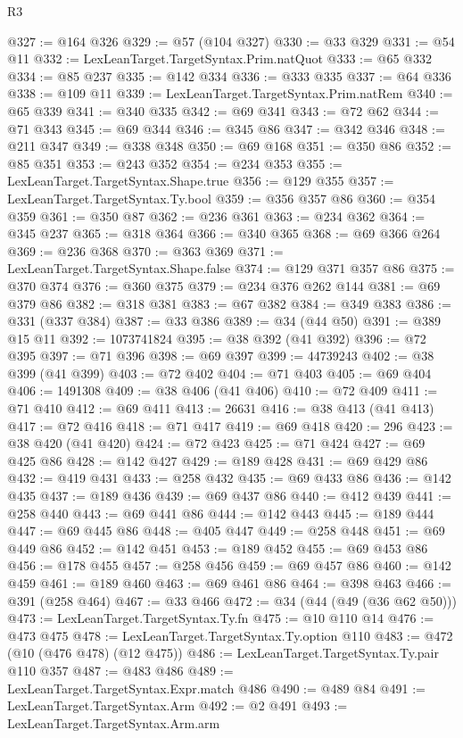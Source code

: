 \begin{lexlean}{R3}
\begin{coremodule}
@327 := @164 @326
@329 := @57 (@104 @327)
@330 := @33 @329
@331 := @54 @11
@332 := LexLeanTarget.TargetSyntax.Prim.natQuot
@333 := @65 @332
@334 := @85 @237
@335 := @142 @334
@336 := @333 @335
@337 := @64 @336
@338 := @109 @11
@339 := LexLeanTarget.TargetSyntax.Prim.natRem
@340 := @65 @339
@341 := @340 @335
@342 := @69 @341
@343 := @72 @62
@344 := @71 @343
@345 := @69 @344
@346 := @345 @86
@347 := @342 @346
@348 := @211 @347
@349 := @338 @348
@350 := @69 @168
@351 := @350 @86
@352 := @85 @351
@353 := @243 @352
@354 := @234 @353
@355 := LexLeanTarget.TargetSyntax.Shape.true
@356 := @129 @355
@357 := LexLeanTarget.TargetSyntax.Ty.bool
@359 := @356 @357 @86
@360 := @354 @359
@361 := @350 @87
@362 := @236 @361
@363 := @234 @362
@364 := @345 @237
@365 := @318 @364
@366 := @340 @365
@368 := @69 @366 @264
@369 := @236 @368
@370 := @363 @369
@371 := LexLeanTarget.TargetSyntax.Shape.false
@374 := @129 @371 @357 @86
@375 := @370 @374
@376 := @360 @375
@379 := @234 @376 @262 @144
@381 := @69 @379 @86
@382 := @318 @381
@383 := @67 @382
@384 := @349 @383
@386 := @331 (@337 @384)
@387 := @33 @386
@389 := @34 (@44 @50)
@391 := @389 @15 @11
@392 := 1073741824
@395 := @38 @392 (@41 @392)
@396 := @72 @395
@397 := @71 @396
@398 := @69 @397
@399 := 44739243
@402 := @38 @399 (@41 @399)
@403 := @72 @402
@404 := @71 @403
@405 := @69 @404
@406 := 1491308
@409 := @38 @406 (@41 @406)
@410 := @72 @409
@411 := @71 @410
@412 := @69 @411
@413 := 26631
@416 := @38 @413 (@41 @413)
@417 := @72 @416
@418 := @71 @417
@419 := @69 @418
@420 := 296
@423 := @38 @420 (@41 @420)
@424 := @72 @423
@425 := @71 @424
@427 := @69 @425 @86
@428 := @142 @427
@429 := @189 @428
@431 := @69 @429 @86
@432 := @419 @431
@433 := @258 @432
@435 := @69 @433 @86
@436 := @142 @435
@437 := @189 @436
@439 := @69 @437 @86
@440 := @412 @439
@441 := @258 @440
@443 := @69 @441 @86
@444 := @142 @443
@445 := @189 @444
@447 := @69 @445 @86
@448 := @405 @447
@449 := @258 @448
@451 := @69 @449 @86
@452 := @142 @451
@453 := @189 @452
@455 := @69 @453 @86
@456 := @178 @455
@457 := @258 @456
@459 := @69 @457 @86
@460 := @142 @459
@461 := @189 @460
@463 := @69 @461 @86
@464 := @398 @463
@466 := @391 (@258 @464)
@467 := @33 @466
@472 := @34 (@44 (@49 (@36 @62 @50)))
@473 := LexLeanTarget.TargetSyntax.Ty.fn
@475 := @10 @110 @14
@476 := @473 @475
@478 := LexLeanTarget.TargetSyntax.Ty.option @110
@483 := @472 (@10 (@476 @478) (@12 @475))
@486 := LexLeanTarget.TargetSyntax.Ty.pair @110 @357
@487 := @483 @486
@489 := LexLeanTarget.TargetSyntax.Expr.match @486
@490 := @489 @84
@491 := LexLeanTarget.TargetSyntax.Arm
@492 := @2 @491
@493 := LexLeanTarget.TargetSyntax.Arm.arm

\end{coremodule}
\end{lexlean}
